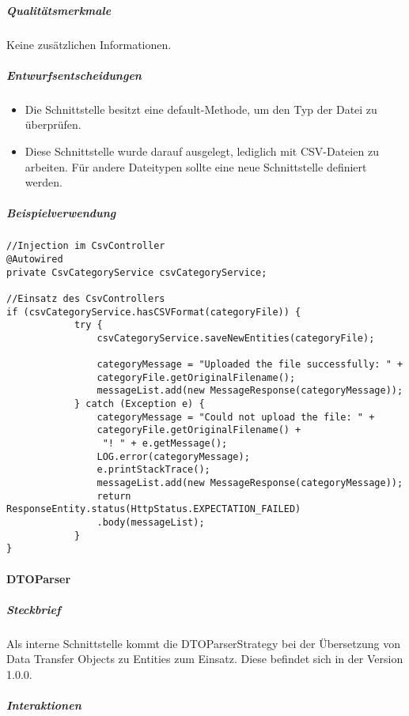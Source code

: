 \subparagraph{Qualitätsmerkmale}
Keine zusätzlichen Informationen.
\subparagraph{Entwurfsentscheidungen}
\begin{itemize}
    \item Die Schnittstelle besitzt eine default-Methode, um den Typ der Datei zu überprüfen.
    \item Diese Schnittstelle wurde darauf ausgelegt, lediglich mit CSV-Dateien zu arbeiten. Für andere Dateitypen sollte eine neue Schnittstelle definiert werden.
\end{itemize}

\subparagraph{Beispielverwendung}
\begin{verbatim}
//Injection im CsvController
@Autowired
private CsvCategoryService csvCategoryService;

//Einsatz des CsvControllers
if (csvCategoryService.hasCSVFormat(categoryFile)) {
            try {
                csvCategoryService.saveNewEntities(categoryFile);

                categoryMessage = "Uploaded the file successfully: " +
                categoryFile.getOriginalFilename();
                messageList.add(new MessageResponse(categoryMessage));
            } catch (Exception e) {
                categoryMessage = "Could not upload the file: " + 
                categoryFile.getOriginalFilename() +
                 "! " + e.getMessage();
                LOG.error(categoryMessage);
                e.printStackTrace();
                messageList.add(new MessageResponse(categoryMessage));
                return ResponseEntity.status(HttpStatus.EXPECTATION_FAILED)
                .body(messageList);
            }
}
\end{verbatim}
\newpage
\paragraph{DTOParser}
\subparagraph{Steckbrief}
Als interne Schnittstelle kommt die DTOParserStrategy bei der Übersetzung von Data Transfer Objects zu Entities zum Einsatz.
Diese befindet sich in der Version 1.0.0.
\subparagraph{Interaktionen}
